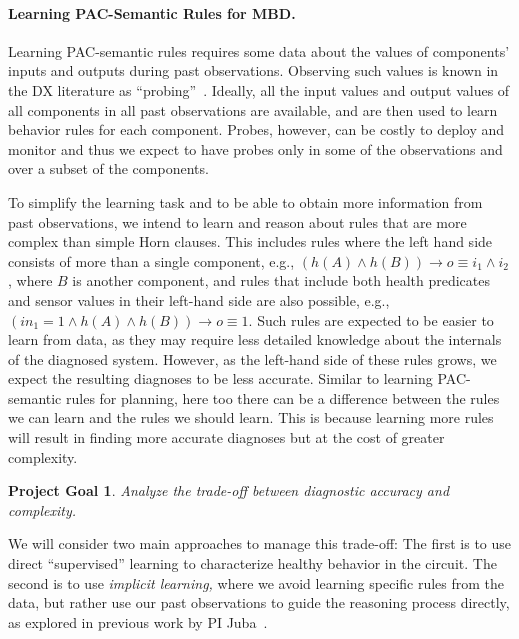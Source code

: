 \documentclass[12pt]{article}
\newtheorem{problem}{Project Goal}
\begin{document}
\paragraph{Learning PAC-Semantic Rules for MBD.}
Learning PAC-semantic rules requires some data about the values of components' inputs and outputs during past observations. Observing such values is known in the DX literature as ``probing''~\cite{deKleer1987diagnosing,rish2004real,feldman2010model}. 
Ideally, all the input values and output values of all components in all past observations are available, 
and are then used to learn behavior rules for each component. 
Probes, however, can be costly to deploy and monitor and thus we expect to have probes only in some of the observations and over a subset of the components. 

To simplify the learning task and to be able to obtain more information from past observations, we intend to learn and reason about rules that are more complex than simple Horn clauses. This includes rules where the left hand side consists  of more than a single component,  e.g., $(h(A)\wedge h(B)) \rightarrow o\equiv i_1\wedge i_2$, where $B$ is another component, 
and rules that include both health predicates and sensor values in their left-hand side are also possible, e.g., 
$(in_1=1 \wedge h(A) \wedge h(B))\rightarrow o\equiv 1$. Such rules are expected to be easier to learn from data, as they may require less detailed knowledge about the internals of the diagnosed system. 
However, as the left-hand side of these rules grows, we expect the resulting diagnoses to be less accurate. 
Similar to learning PAC-semantic rules for planning, here too there can be a difference between the rules we can learn and the rules we should learn. This is because learning more rules will result in finding more accurate diagnoses but at the cost of greater complexity. 
\begin{problem}
Analyze the trade-off between diagnostic accuracy and complexity. 
\end{problem}


We will consider two main approaches to manage this trade-off: The first is to use direct ``supervised'' learning to characterize healthy behavior in the circuit. The second is to use {\em implicit learning,} where we avoid learning specific rules from the data, but rather use our past observations to guide the reasoning process directly, as explored in previous work by PI Juba~\cite{juba2013ijcai}.
\end{document}
